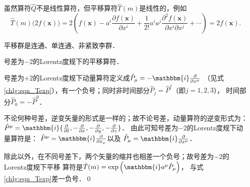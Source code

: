 虽然算符$\hat{Q}$不是线性算符，但平移算符$\hat{T}(m)$是线性的，例如
\begin{equation*}
    \hat{T}(m) \bigl(2f(\boldsymbol{x})\bigr) 
    =2\left( f(\boldsymbol{x}) - a^i \frac{\partial f(\boldsymbol{x})}{\partial x^i}
    +\frac{1}{2!} a^i a^j \frac{\partial^2 f(\boldsymbol{x})}{\partial x^i \partial x^j}
    +\cdots \right) = 2 f(\boldsymbol{x}) .
\end{equation*}

平移群是连通、单连通、非紧致李群．

\begin{example}\label{chlg:exam_pm2}
    号差为$-2$的Lorentz度规下的平移算符．
\end{example}
号差为$+2$的Lorentz度规下动量算符定义成$\hat{P}_\mu =- \mathbbm{i}\frac{\partial }{\partial x^\mu}$
（见式\eqref{chlg:eqn_Texp}），有一个负号；同时非时间部分$\hat{P}_j =\hat{P}^j$（即$j=1,2,3$），
时间部分$\hat{P}_0 =-\hat{P}^0$．

不论何种号差，逆变矢量的形式是一样的；故不论号差，动量算符的逆变形式为：
$\hat{P}^\mu=\mathbbm{i}\{\frac{\partial}{\partial t}, -\frac{\partial}{\partial x},
-\frac{\partial}{\partial y},-\frac{\partial}{\partial z}\}$．
由此可知号差为$-2$的Lorentz度规下动量算符是：
$\hat{P}^\mu = \mathbbm{i}\frac{\partial }{\partial x_\mu}$以及
$\hat{P}_\mu = \mathbbm{i}\frac{\partial }{\partial x^\mu}$．

除此以外，在不同号差下，两个矢量的缩并也相差一个负号；故号差为$-2$的Lorentz度规下平移
算符是$\hat{T}(m) = \exp\left(\mathbbm{i} a^\mu \hat{P}_\mu  \right) $，
与式\eqref{chlg:eqn_Texp}差一负号．\qed



